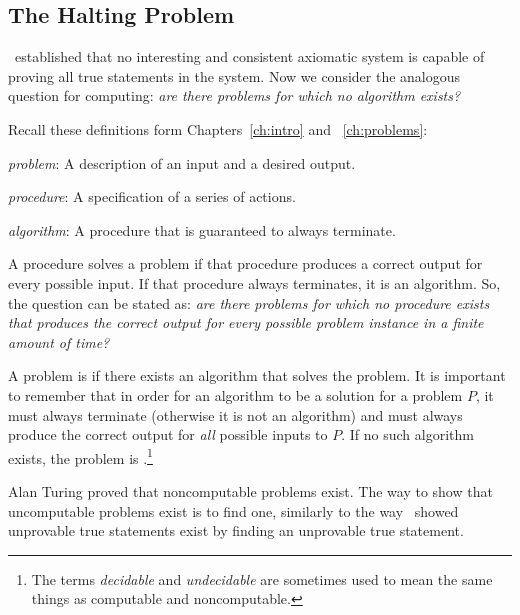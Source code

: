 \begin{schemeregion}
\section{The Halting Problem}\label{sec:haltingproblem}

\Godel\ established that no interesting and consistent axiomatic system is capable of proving all true statements in the system.  Now we consider the analogous question for computing: \emph{are there problems for which no algorithm exists?}  

Recall these definitions form Chapters~\ref{ch:intro} and ~\ref{ch:problems}:
\begin{descriptionlist}
\item [\emph{problem}:] A description of an input and a desired output.  
\item [\emph{procedure}:] A specification of a series of actions.  
\item [\emph{algorithm}:] A procedure that is guaranteed to always terminate.   
\end{descriptionlist}
A procedure solves a problem if that procedure produces a correct output for every possible input.  If that procedure always terminates, it is an algorithm.  So, the question can be stated as: \emph{are there problems for which no procedure exists that produces the correct output for every possible problem instance in a finite amount of time?}   

A problem is  if there exists an algorithm that solves the problem. It is important to remember that in order for an algorithm to be a solution for a problem $P$, it must always terminate (otherwise it is not an algorithm) and must always produce the correct output for \emph{all} possible inputs to $P$. If no such algorithm exists, the problem is .\footnote{The terms \emph{decidable} and \emph{undecidable} are sometimes used to mean the same things as computable and noncomputable.}


Alan Turing proved that noncomputable problems exist.  The way to show that uncomputable problems exist is to find one, similarly to the way \Godel\ showed unprovable true statements exist by finding an unprovable true statement.  


\end{schemeregion}

